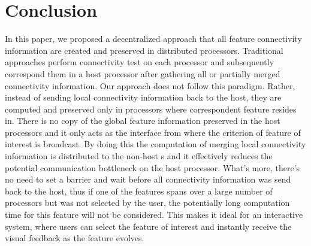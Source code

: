 \documentclass[10pt, conference, compsocconf]{IEEEtran}
\begin{document}
\section{Conclusion}
In this paper, we proposed a decentralized approach that all feature connectivity information are created and preserved in distributed processors. Traditional approaches perform connectivity test on each processor and subsequently correspond them in a host processor after gathering all or partially merged connectivity information. Our approach does not follow this paradigm. Rather, instead of sending local connectivity information back to the host, they are computed and preserved only in processors where correspondent feature resides in. There is no copy of the global feature information preserved in the host processors and it only acts as the interface from where the criterion of feature of interest is broadcast. By doing this the computation of merging local connectivity information is distributed to the non-host s and it effectively reduces the potential communication bottleneck on the host processor. What's more, there's no need to set a barrier and wait before all connectivity information was send back to the host, thus if one of the features spans over a large number of processors but was not selected by the user, the potentially long computation time for this feature will not be considered. This makes it ideal for an interactive system, where users can select the feature of interest and instantly receive the visual feedback as the feature evolves.



%
%
\end{document}
